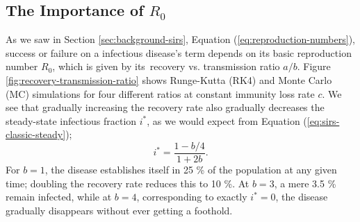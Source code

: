 \documentclass[]{article}
\begin{document}
\subsection{The Importance of $R_0$} \label{sec:recovery-rates}

As we saw in Section \ref{sec:background-sirs}, Equation (\ref{eq:reproduction-numbers}), success or failure on a infectious disease's term depends on its basic reproduction number $R_0$, which is given by its recovery vs. transmission ratio $a/b$. Figure \ref{fig:recovery-transmission-ratio} shows Runge-Kutta (RK4) and Monte Carlo (MC) simulations for four different ratios at constant immunity loss rate $c$. We see that gradually increasing the recovery rate also gradually decreases the steady-state infectious fraction $i^*$, as we would expect from Equation (\ref{eq:sirs-classic-steady});
\begin{equation}
	i^* = \frac{1 - b/4}{1 + 2b}.
\end{equation}
For $b = 1$, the disease establishes itself in 25 \% of the population at any given time; doubling the recovery rate reduces this to 10 \%. At $b = 3$, a mere 3.5 \% remain infected, while at $b = 4$, corresponding to exactly $i^* = 0$, the disease gradually disappears without ever getting a foothold.
\end{document}
